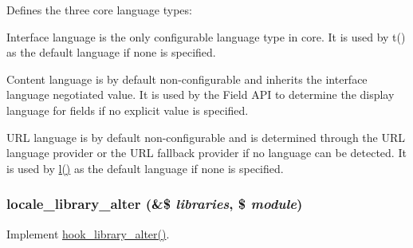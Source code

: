 Defines the three core language types:
\begin{DoxyItemize}
\item Interface language is the only configurable language type in core. It is used by t() as the default language if none is specified.
\item Content language is by default non-\/configurable and inherits the interface language negotiated value. It is used by the Field API to determine the display language for fields if no explicit value is specified.
\item URL language is by default non-\/configurable and is determined through the URL language provider or the URL fallback provider if no language can be detected. It is used by \hyperlink{common_8inc_ad3b36c06dc46250b8d22b8d0d2e7bd97}{l()} as the default language if none is specified. 
\end{DoxyItemize}\hypertarget{locale_8module_acf4b87e784cf2fe602bdc4e5a5771005}{
\subsubsection[{locale\_\-library\_\-alter}]{\setlength{\rightskip}{0pt plus 5cm}locale\_\-library\_\-alter (\&\$ {\em libraries}, \/  \$ {\em module})}}
\label{locale_8module_acf4b87e784cf2fe602bdc4e5a5771005}
Implement \hyperlink{group__hooks_ga7256c50068666c9c02f43a08efcefae7}{hook\_\-library\_\-alter()}.

